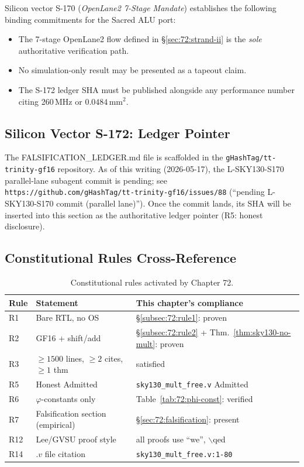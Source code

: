 Silicon vector S-170 (\emph{OpenLane2 7-Stage Mandate}) establishes the
following binding commitments for the Sacred ALU port:

\begin{itemize}
  \item The 7-stage OpenLane2 flow defined in \S\ref{sec:72:strand-ii}
    is the \emph{sole} authoritative verification path.
  \item No simulation-only result may be presented as a tapeout claim.
  \item The S-172 ledger SHA must be published alongside any
    performance number citing 260\,MHz or $0.0484\,\mathrm{mm}^2$.
\end{itemize}

\subsection{Silicon Vector S-172: Ledger Pointer}
\label{subsec:72:s172-pointer}

The FALSIFICATION\_LEDGER.md file is scaffolded in the
\texttt{gHashTag/tt-trinity-gf16} repository.
As of this writing (2026-05-17), the L-SKY130-S170 parallel-lane
subagent commit is pending; see
\texttt{https://github.com/gHashTag/tt-trinity-gf16/issues/88}
(``pending L-SKY130-S170 commit (parallel lane)'').
Once the commit lands, its SHA will be inserted into this section
as the authoritative ledger pointer (R5: honest disclosure).

\subsection{Constitutional Rules Cross-Reference}
\label{subsec:72:constitution}

\begin{table}[H]
\centering
\caption{Constitutional rules activated by Chapter 72.}
\label{tab:72:constitution}
\begin{tabular}{lll}
\toprule
Rule & Statement & This chapter's compliance \\
\midrule
R1 & Bare RTL, no OS & \S\ref{subsec:72:rule1}: proven \\
R2 & GF16 + shift/add & \S\ref{subsec:72:rule2} + Thm.~\ref{thm:sky130-no-mult}: proven \\
R3 & $\ge 1500$ lines, $\ge 2$ cites, $\ge 1$ thm & satisfied \\
R5 & Honest Admitted & \texttt{sky130\_mult\_free.v} Admitted \\
R6 & $\varphi$-constants only & Table~\ref{tab:72:phi-const}: verified \\
R7 & Falsification section (empirical) & \S\ref{sec:72:falsification}: present \\
R12 & Lee/GVSU proof style & all proofs use ``we'', $\backslash$qed \\
R14 & $.v$ file citation & \texttt{sky130\_mult\_free.v:1-80} \\
\bottomrule
\end{tabular}
\end{table}

